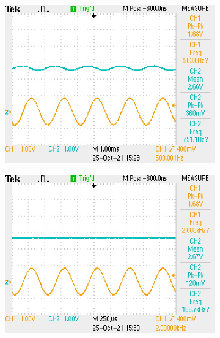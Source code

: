 \documentclass[11pt]{article}
\begin{document}
{\begin{figure}[h!]
\begin{subfigure}{0.3\textwidth}
    \includegraphics[width=\columnwidth]{img/testing/input_filter/input_500Hz.JPG}
  \end{subfigure}
  \begin{subfigure}{0.3\textwidth}
    \includegraphics[width=\columnwidth]{img/testing/input_filter/input_2kHz.JPG}
  \end{subfigure}
\end{figure}

}
\end{document}

